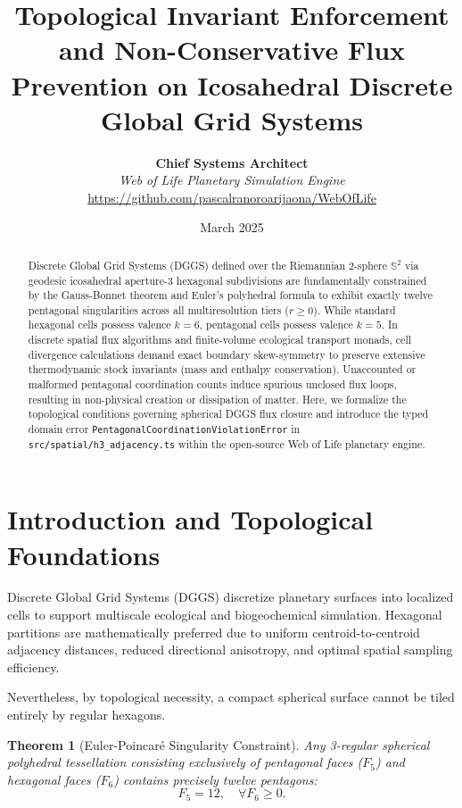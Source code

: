 \documentclass[11pt,a4paper]{article}
\title{\textbf{Topological Invariant Enforcement and Non-Conservative Flux Prevention on Icosahedral Discrete Global Grid Systems}}
\author{
  \textbf{Chief Systems Architect} \\
  \textit{Web of Life Planetary Simulation Engine} \\
  \href{https://github.com/pascalranoroarijaona/WebOfLife}{https://github.com/pascalranoroarijaona/WebOfLife}
}
\date{March 2025}
\newtheorem{theorem}{Theorem}
\begin{document}
\maketitle

\begin{abstract}
Discrete Global Grid Systems (DGGS) defined over the Riemannian 2-sphere $\mathbb{S}^2$ via geodesic icosahedral aperture-3 hexagonal subdivisions are fundamentally constrained by the Gauss-Bonnet theorem and Euler's polyhedral formula to exhibit exactly twelve pentagonal singularities across all multiresolution tiers ($r \ge 0$). While standard hexagonal cells possess valence $k=6$, pentagonal cells possess valence $k=5$. In discrete spatial flux algorithms and finite-volume ecological transport monads, cell divergence calculations demand exact boundary skew-symmetry to preserve extensive thermodynamic stock invariants (mass and enthalpy conservation). Unaccounted or malformed pentagonal coordination counts induce spurious unclosed flux loops, resulting in non-physical creation or dissipation of matter. Here, we formalize the topological conditions governing spherical DGGS flux closure and introduce the typed domain error \texttt{PentagonalCoordinationViolationError} in \texttt{src/spatial/h3\_adjacency.ts} within the open-source Web of Life planetary engine.
\end{abstract}

\section{Introduction and Topological Foundations}

Discrete Global Grid Systems (DGGS) discretize planetary surfaces into localized cells to support multiscale ecological and biogeochemical simulation. Hexagonal partitions are mathematically preferred due to uniform centroid-to-centroid adjacency distances, reduced directional anisotropy, and optimal spatial sampling efficiency.

Nevertheless, by topological necessity, a compact spherical surface cannot be tiled entirely by regular hexagons.

\begin{theorem}[Euler-Poincaré Singularity Constraint]
Any 3-regular spherical polyhedral tessellation consisting exclusively of pentagonal faces ($F_5$) and hexagonal faces ($F_6$) contains precisely twelve pentagons:
\begin{equation}
F_5 = 12, \quad \forall F_6 \ge 0.
\end{equation}
\end{theorem}
\end{document}
